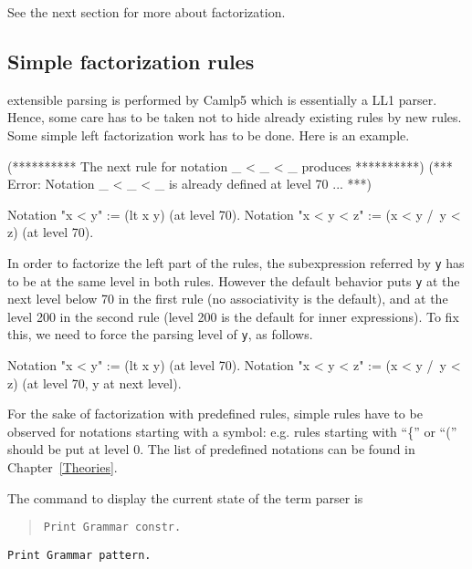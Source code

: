 See the next section for more about factorization.

\subsection{Simple factorization rules}

{\Coq} extensible parsing is performed by Camlp5 which is essentially a
LL1 parser. Hence, some care has to be taken not to hide already
existing rules by new rules. Some simple left factorization work has
to be done. Here is an example.

\begin{coq_eval}
(********** The next rule for notation _ < _ < _  produces **********)
(*** Error: Notation _ < _ < _ is already defined at level 70 ... ***)
\end{coq_eval}
\begin{coq_example*}
Notation "x < y"     := (lt x y) (at level 70).
Notation "x < y < z" := (x < y /\ y < z) (at level 70).
\end{coq_example*}

In order to factorize the left part of the rules, the subexpression
referred by {\tt y} has to be at the same level in both rules. However
the default behavior puts {\tt y} at the next level below 70
in the first rule (no associativity is the default), and at the level
200 in the second rule (level 200 is the default for inner expressions).
To fix this, we need to force the parsing level of {\tt y},
as follows.

\begin{coq_example*}
Notation "x < y"     := (lt x y) (at level 70).
Notation "x < y < z" := (x < y /\ y < z) (at level 70, y at next level).
\end{coq_example*}

For the sake of factorization with {\Coq} predefined rules, simple
rules have to be observed for notations starting with a symbol:
e.g. rules starting with ``\{'' or ``('' should be put at level 0. The
list of {\Coq} predefined notations can be found in Chapter~\ref{Theories}.

The command to display the current state of the {\Coq} term parser is

\begin{quote}
\tt Print Grammar constr.
\end{quote}

\variant

{\tt Print Grammar pattern.}\\

